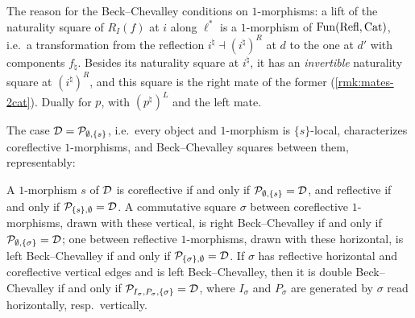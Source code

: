 %
The reason for the Beck--Chevalley conditions on $1$-morphisms:
a lift of the naturality square of $R_{I}(f)$ at $i$ along $\ell^{*}$ is a
$1$-morphism of $\operatorname{Fun}(\mathrm{Refl},\mathrm{Cat})$, i.e.\ a transformation from the reflection
$i^{\natural} \dashv (i^{\natural})^{R}$
at $d$ to the one at $d'$ with components $f_{\natural}$.
Besides its naturality square at $i^{\natural}$,
it has an \emph{invertible} naturality square at $(i^{\natural})^{R}$,
and this square is the right mate of the former
(\cref{rmk:mates-2cat}).
Dually for $p$,
with $(p^{\natural})^{L}$ and the left mate.

%
The case
$\mathcal{D} = \mathcal{P}_{\emptyset,\{s\}}$,
i.e.\ every object and $1$-morphism is $\{s\}$-local,
characterizes coreflective $1$-morphisms,
and Beck--Chevalley squares between them, representably:

\begin{lem}
\label{lem:repr-refl}
%
A $1$-morphism $s$ of $\mathcal{D}$ is coreflective if and only if
$\mathcal{P}_{\emptyset,\{s\}} = \mathcal{D}$,
and reflective if and only if
$\mathcal{P}_{\{s\},\emptyset} = \mathcal{D}$.
A commutative square $\sigma$ between coreflective $1$-morphisms,
drawn with these vertical, is right Beck--Chevalley if and only if
$\mathcal{P}_{\emptyset,\{\sigma\}} = \mathcal{D}$;
one between reflective $1$-morphisms, drawn with these horizontal,
is left Beck--Chevalley if and only if
$\mathcal{P}_{\{\sigma\},\emptyset} = \mathcal{D}$.
If $\sigma$ has reflective horizontal and coreflective vertical edges and is
left Beck--Chevalley, then it is double Beck--Chevalley if and only if
$\mathcal{P}_{I_{\sigma},P_{\sigma},\{\sigma\}} = \mathcal{D}$,
where $I_{\sigma}$ and $P_{\sigma}$ are generated by $\sigma$ read
horizontally, resp.\ vertically.
\end{lem}

